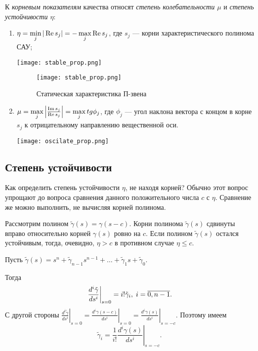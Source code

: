 \documentclass[../../TAU.tex]{subfiles}
\begin{document}
    К {\it корневым показателям} качества относят {\it степень колебательности $\mu$} и {\it степень устойчивости $\eta$}:
    \begin{enumerate}
        \item 
            $\eta=\min\limits_{j}|\mathop{\mathrm{Re}}\nolimits s_j| = -\max\limits_j \mathop{\mathrm{Re}}\nolimits s_j$, где $s_j$ --- корни характеристического полинома САУ;\\
            \begin{center}
            \texttt{[image: stable\_prop.png]}
            \end{center}

            \begin{figure}[h]
                \centering
                \texttt{[image: stable\_prop.png]}
                \caption{Статическая характеристика П-звена}
                \centering
            \end{figure}
        \item 
            $\mu = \max\limits_j\left|\frac{\mathop{\mathrm{Im}}\nolimits s_j}{\mathop{\mathrm{Re}}\nolimits s_j}\right| = \max\limits_j tg\phi_j$, где $\phi_j$ --- угол наклона вектора с концом в корне $s_j$ к отрицательному направлению вещественной оси.
            \begin{center}
            \texttt{[image: oscilate\_prop.png]}
            \end{center}
    \end{enumerate}

\subsection{Степень устойчивости}

    Как определить степень устойчивости $\eta$, не находя корней? Обычно этот вопрос упрощают до вопроса сравнения данного положительного числа $c$ с $\eta$. Сравнение же можно выполнить, не вычисляя  корней полинома.

    Рассмотрим полином $\tilde\gamma(s) = \gamma(s-c)$. Корни полинома $\tilde\gamma(s)$ сдвинуты вправо относительно корней $\gamma(s)$ ровно на $c$. Если полином $\tilde\gamma(s)$ остался устойчивым, тогда, очевидно, $\eta > c$ в противном случае $\eta \le c$.

    Пусть $\tilde\gamma(s) = s^n + \tilde\gamma_{n-1}s^{n-1} + \ldots + \tilde\gamma_1 s + \tilde\gamma_0.$

    Тогда
    $$
        \left.\frac{d^i \tilde\gamma}{ds^i}\right|_{s=0} = i!\tilde\gamma_i,\; i=\overline{0,n-1}.
    $$
    С другой стороны $\left.\frac{d^i \tilde\gamma}{ds^i}\right|_{s=0} = \left.\frac{d^i \gamma(s-c)}{ds^i}\right|_{s=0}=\left.\frac{d^i \gamma(s)}{ds^i}\right|_{s=-c}$. Поэтому имеем
    $$
        \tilde\gamma_i = \frac{1}{i!}\left.\frac{d^i \gamma(s)}{ds^i}\right|_{s=-c}.
    $$
\end{document}
